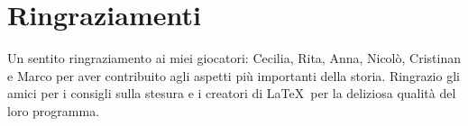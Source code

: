 
\begingroup
\let\clearpage\relax
\let\cleardoublepage\relax
\let\cleardoublepage\relax

\chapter*{Ringraziamenti}
Un sentito ringraziamento ai miei giocatori: Cecilia, Rita, Anna, Nicol\`o, Cristinan e Marco per aver contribuito agli aspetti pi\`u importanti della storia. Ringrazio gli amici per i consigli sulla stesura e i creatori di \LaTeX\ per la deliziosa qualit\`a del loro programma.
\endgroup



